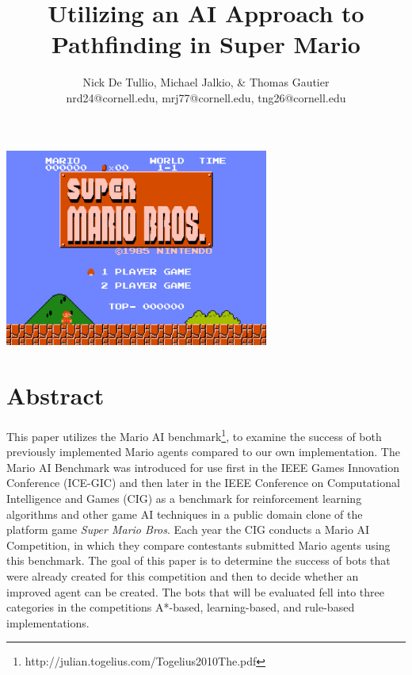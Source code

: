 \documentclass[12pt]{article}
\begin{document}
\title{{\bf \large Utilizing an AI Approach to Pathfinding in Super Mario}\vspace{-2ex}}
\author{{\small Nick De Tullio, Michael Jalkio, \& Thomas Gautier}
\\ {\small nrd24@cornell.edu, mrj77@cornell.edu, tng26@cornell.edu}\vspace{-9ex}}
\date{}

\maketitle
\vspace{-7.5ex}
\begin{center}
\includegraphics[width=0.65\textwidth]{waste_of_space} 
\end{center}
\vspace{-4.5ex}

\section * {Abstract}
This paper utilizes the Mario AI benchmark\footnote{http://julian.togelius.com/Togelius2010The.pdf}, to examine the success of both previously implemented Mario agents 
compared to our own implementation. The Mario AI Benchmark was introduced for use first in the IEEE Games 
Innovation Conference (ICE-GIC) and then later in the IEEE Conference on Computational Intelligence and Games (CIG) as a benchmark for 
reinforcement learning algorithms and other game AI techniques in a public domain clone of the platform game {\it 
Super Mario Bros}. Each year the CIG conducts a Mario AI Competition, in which they compare contestants 
submitted Mario agents using this benchmark. The goal of this paper is to determine the success of bots that were already 
created for this competition and then to decide whether an improved agent can be created. The bots that will be 
evaluated fell into three categories in the competitions A*-based, learning-based, and rule-based implementations.
\end{document}
